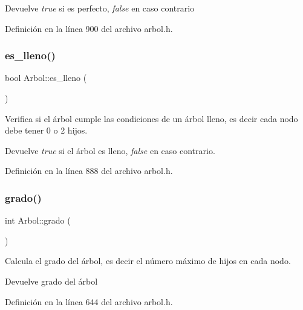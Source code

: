 \begin{DoxyReturn}{Devuelve}
{\itshape true} si es perfecto, {\itshape false} en caso contrario 
\end{DoxyReturn}


Definición en la línea 900 del archivo arbol.\+h.

\mbox{\label{classArbol_a14ccdbb79a82bf19a24449acaea6c413}} 
\subsubsection{\texorpdfstring{es\+\_\+lleno()}{es\_lleno()}}
{\footnotesize\ttfamily bool Arbol\+::es\+\_\+lleno (\begin{DoxyParamCaption}{ }\end{DoxyParamCaption})}



Verifica si el árbol cumple las condiciones de un árbol lleno, es decir cada nodo debe tener 0 o 2 hijos. 

\begin{DoxyReturn}{Devuelve}
{\itshape true} si el árbol es lleno, {\itshape false} en caso contrario. 
\end{DoxyReturn}


Definición en la línea 888 del archivo arbol.\+h.

\mbox{\label{classArbol_a99e608849650b891c34852a81f93d4ab}} 
\subsubsection{\texorpdfstring{grado()}{grado()}}
{\footnotesize\ttfamily int Arbol\+::grado (\begin{DoxyParamCaption}{ }\end{DoxyParamCaption})}



Calcula el grado del árbol, es decir el número máximo de hijos en cada nodo. 

\begin{DoxyReturn}{Devuelve}
grado del árbol 
\end{DoxyReturn}


Definición en la línea 644 del archivo arbol.\+h.

\mbox{\label{classArbol_a59ae16f1a68c5e5afd08be20dcbf5717}} 
